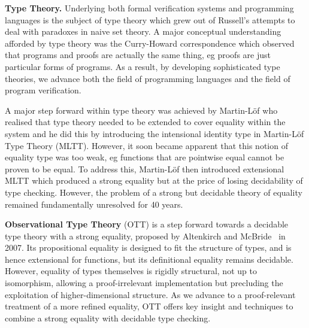 \documentclass[a4paper,11pt]{article}
\begin{document}
{\bf Type Theory.} Underlying both formal verification systems and
programming languages is the subject of type theory which grew out of
Russell's attempts to deal with paradoxes in naive set theory. A major
conceptual understanding afforded by type theory was the Curry-Howard
correspondence which observed that programs and proofs are actually
the same thing, eg proofs are just particular forms of programs. As a
result, by developing sophisticated type theories, we advance both the
field of programming languages and the field of program verification.

A major step forward within type theory was achieved by Martin-L\"of
who realised that type theory needed to be extended to cover equality
within the system and he did this by introducing the intensional
identity type in Martin-L\"of Type Theory (MLTT).
However, it soon became apparent that this notion of equality type was
too weak, eg functions that are pointwise equal cannot be proven to
be equal. To address this, Martin-L\"of then introduced extensional
MLTT which produced a strong equality but at the price of
losing decidability of type checking. However, the problem of a strong but
decidable theory of equality remained fundamentally unresolved for 40
years. 


{\bf Observational Type Theory} (OTT) is a step forward towards a
decidable type theory with a strong equality, proposed by
Altenkirch and McBride~\cite{alti:ott-conf} in 2007. Its propositional equality is designed
to fit the structure of types, and is hence extensional for functions,
but its definitional equality remains decidable. However, equality of
types themselves is rigidly structural, not up to isomorphism,
allowing a proof-irrelevant implementation but precluding the
exploitation of higher-dimensional structure. As we advance to a
proof-relevant treatment of a more refined equality, OTT offers key
insight and techniques to combine a strong equality with decidable
type checking.



\end{document}

